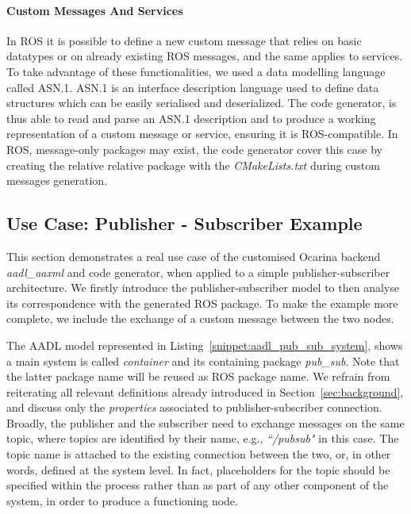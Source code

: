 \paragraph{Custom Messages And Services} In ROS it is possible to define a new custom message that relies on basic datatypes or on already existing ROS messages, and the same applies to services. To take advantage of these functionalities, we used a data modelling language called ASN.1. ASN.1 is an interface description language used to define data structures which can be easily serialised and deserialized. The code generator, is thus able to read and parse an ASN.1 description and to produce a working representation of a custom message or service, ensuring it is ROS-compatible. In ROS, message-only packages may exist, the code generator cover this case by creating the relative relative package with the \textit{CMakeLists.txt} during custom messages generation.

\subsection{Use Case: Publisher - Subscriber Example} \label{sec:use-case}

This section demonstrates a real use case of the customised Ocarina backend \textit{aadl\_aaxml} and code generator, when applied to a simple publisher-subscriber architecture. %
We firstly introduce the publisher-subscriber model to then analyse its correspondence with the generated ROS package. To make the example more complete, we include the exchange of a custom message between the two nodes.

The AADL model represented in Listing~\ref{snippet:aadl_pub_sub_system}, shows a main system is called \textit{container} and its containing package \textit{pub\_sub}. Note that the latter package name will be reused as ROS package name. 
We refrain from reiterating all relevant definitions already introduced in Section~\ref{sec:background}, and discuss only the \textit{properties} associated to publisher-subscriber connection. Broadly, the publisher and the subscriber need to exchange messages on the same topic, where topics are identified by their name, e.g.,  \textit{``/pubsub"} in this case. The topic name is attached to the existing connection between the two, or, in other words, defined at the system level. In fact, placeholders for the topic should be specified within the process rather than as part of any other component of the system, in order to produce a functioning node.

